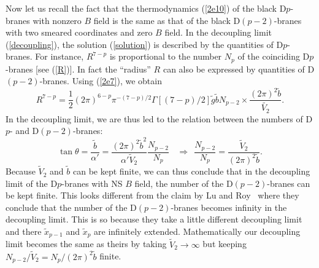 \documentclass[a4paper,12pt]{article}
\begin{document}
Now let us recall the fact that the thermodynamics (\ref{2e10}) of the
black D$p$-branes with nonzero $B$ field is the same as that of the
black D$(p-2)$-branes with two smeared coordinates and zero
$B$ field. In the decoupling limit (\ref{decoupling}), the solution
(\ref{solution}) is described by the quantities of D$p$-branes. For
instance, $R^{7-p}$ is proportional to the number $N_p$ of the coinciding
D$p$-branes [see (\ref{R})]. In fact the ``radius'' $R$ can also be
expressed by quantities of D$(p-2)$-branes. Using (\ref{2e7}), we obtain
\begin{equation}
\label{R2}
R^{7-p} = \frac{1}{2}(2\pi)^{6-p}\pi^{-(7-p)/2}\Gamma[(7-p)/2]
    \tilde{g}\tilde{b}N_{p-2}\times \frac{(2\pi)^2\tilde{b}}{\tilde{V_2}}.
\end{equation}
In the decoupling limit, we are thus led to the relation between the numbers
of D$p$- and D$(p-2)$-branes:
\begin{equation}
\label{number}
\tan\theta = \frac{\tilde{b}}{\alpha'} = \frac{(2\pi)^2\tilde{b}^2}
  {\alpha'\tilde{V}_2}\frac{N_{p-2}}{N_p}\ \ \ \
 \Longrightarrow \ \ \frac{N_{p-2}}{N_p}
 = \frac{\tilde{V}_2}{(2\pi)^2\tilde{b}}.
\end{equation}
Because $\tilde{V}_2$ and $\tilde{b}$ can be kept finite, we can thus
conclude that in the decoupling limit of the D$p$-branes with NS $B$ field,
the number of the D$(p-2)$-branes can be kept finite. This looks different
from the claim by Lu and Roy~\cite{Lu} where they conclude that the number
of the D$(p-2)$-branes becomes infinity in the decoupling limit. This is
so because they take a little different decoupling limit and there
$\tilde{x}_{p-1}$ and $\tilde{x}_p$ are infinitely extended. Mathematically
our decoupling limit becomes the same as theirs by taking
$\tilde{V}_2 \rightarrow \infty$ but keeping $N_{p-2}/\tilde{V}_2 =
N_p/(2\pi)^2\tilde{b}$ finite.
\end{document}
